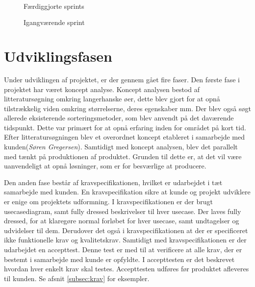 \begin{figure}[htbp]
\begin{minipage}[b]{0.48\textwidth}
\end{minipage} \\ %
\begin{minipage}[t]{0.48\textwidth}
\caption{Færdiggjorte sprints} %
\label{fig:pt_sprints}
\end{minipage} \hfill
\begin{minipage}[t]{0.48\textwidth}
\caption{Igangværende sprint} %
\label{fig:pt_currentsprint}
\end{minipage}
\end{figure}

\section{Udviklingsfasen}
Under udviklingen af projektet, er der gennem gået fire faser. Den første fase i projektet har været koncept analyse. Koncept analysen bestod af litteratursøgning omkring langerhanske øer, dette blev gjort for at opnå tilstrækkelig viden omkring størrelserne, deres egenskaber mm. Der blev også søgt allerede eksisterende sorteringsmetoder, som blev anvendt på det daværende tidspunkt. Dette var primært for at opnå erfaring inden for området på kort tid. Efter litteratursøgningen blev et overordnet koncept etableret i samarbejde med kunden(\textit{Søren Gregersen}). Samtidigt med koncept analysen, blev det parallelt med tænkt på produktionen af produktet. Grunden til dette er, at det vil være uanvendeligt at opnå løsninger, som er for besværlige at producere. 

Den anden fase består af kravspecifikationen, hvilket er udarbejdet i tæt samarbejde med kunden. En kravspecifikation sikre at kunde og projekt udviklere er enige om projektets udformning. I kravspecifikationen er der brugt usecasediagram, samt fully dressed beskrivelser til hver usecase. Der laves fully dressed, for at klaregøre normal forløbet for hver usecase, samt undtagelser og udvidelser til dem. Derudover det også i kravspecifikationen at der er specificeret ikke funktionelle krav og kvalitetskrav. Samtidigt med kravspecifikationen er der udarbejdet en accepttest. Denne test er med til at verificere at alle krav, der er bestemt i samarbejde med kunde er opfyldte. I accepttesten er det beskrevet hvordan hver enkelt krav skal testes. Accepttesten udføres før produktet afleveres til kunden. Se afsnit \ref{subsec:krav} for eksempler.

